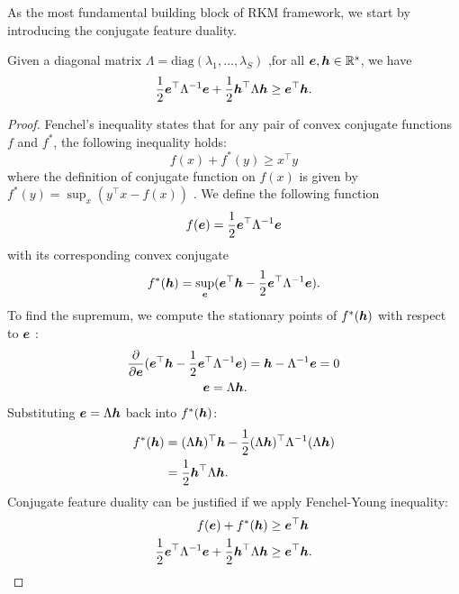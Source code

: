 As the most fundamental building block of RKM framework, we start by introducing the conjugate feature duality.
\begin{lemma} 
Given a diagonal matrix $\Lambda = \text{diag}(\lambda_1,\dots,\lambda_S)$ ,for all $ \boldsymbol{e}, \boldsymbol{h}\in \mathbb{R}^{s}$, we have
\begin{equation}
         \frac{1}{2}\boldsymbol{e}^\top\Lambda^{-1}\boldsymbol{e} + \frac{1}{2}\boldsymbol{h}^\top\Lambda\boldsymbol{h} \geq \boldsymbol{e}^\top\boldsymbol{h}.
\end{equation}
\end{lemma}

\begin{proof}
Fenchel's inequality states that for any pair of convex conjugate functions $f$ and $f^*$, the following inequality holds:
\begin{equation}
    f(x) + f^{*}(y) \geq x^\top y
\end{equation}
where the definition of conjugate function on $f(x)$ is given by $f^{*}(y) = \sup _{x} (y^\top x - f(x))$ \cite{boydConvexOptimization2004}. We define the following function  
\begin{equation}
    f(\boldsymbol{e}) = \frac{1}{2}\boldsymbol{e}^\top \Lambda^{-1} \boldsymbol{e}
\end{equation}
with its corresponding convex conjugate
\begin{equation}
    f^{*}(\boldsymbol{h}) = \sup_{\boldsymbol{e}} (\boldsymbol{e}^\top\boldsymbol{h} - \frac{1}{2}\boldsymbol{e}^\top\Lambda^{-1}\boldsymbol{e}).
\end{equation}
To find the supremum, we compute the stationary points of $f^{*}(\boldsymbol{h})$ with respect to $\boldsymbol{e}$ : 
\begin{equation}
    \begin{aligned}
    \frac{\partial}{\partial \boldsymbol{e}} (\boldsymbol{e}^\top\boldsymbol{h} - \frac{1}{2}\boldsymbol{e}^\top\Lambda^{-1}\boldsymbol{e}) &= \boldsymbol{h} - \Lambda^{-1}\boldsymbol{e} = 0 \\
    \boldsymbol{e} = \Lambda\boldsymbol{h}.
    \end{aligned}
\end{equation}
Substituting $\boldsymbol{e} = \Lambda\boldsymbol{h}$ back into $f^{*}(\boldsymbol{h})$:
\begin{equation}
    \begin{aligned}
        f^{*}(\boldsymbol{h}) & = (\Lambda\boldsymbol{h})^\top\boldsymbol{h} - \frac{1}{2}(\Lambda\boldsymbol{h})^\top\Lambda^{-1}(\Lambda\boldsymbol{h}) \\
        &= \frac{1}{2}\boldsymbol{h}^\top \Lambda\boldsymbol{h}.
    \end{aligned}
\end{equation}
Conjugate feature duality can be justified if we apply Fenchel-Young inequality:
\begin{equation}
    \begin{aligned}
        f(\boldsymbol{e}) + f^*(\boldsymbol{h}) &\geq \boldsymbol{e}^\top \boldsymbol{h} \\
         \frac{1}{2}\boldsymbol{e}^\top\Lambda^{-1}\boldsymbol{e} + \frac{1}{2}\boldsymbol{h}^\top\Lambda\boldsymbol{h} &\geq \boldsymbol{e}^\top\boldsymbol{h}.
    \end{aligned}
\end{equation}
\end{proof}
